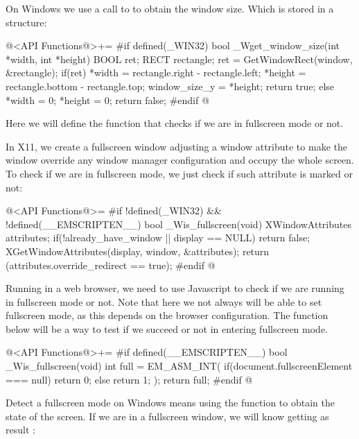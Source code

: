 
On Windows we use a call to  to obtain the
window size. Which is stored in a  structure:

\iniciocodigo
@<API Functions@>+=
#if defined(_WIN32)
bool _Wget_window_size(int *width, int *height){
  BOOL ret;
  RECT rectangle;
  ret = GetWindowRect(window, &rectangle);
  if(ret){
    *width = rectangle.right - rectangle.left;
    *height = rectangle.bottom - rectangle.top;
    window_size_y = *height;
    return true;
  }
  else{
    *width = 0;
    *height = 0;
    return false;
  }
}
#endif
@
\fimcodigo


Here we will define the function that checks if we are in fullscreen
mode or not.


In X11, we create a fullscreen window adjusting a window attribute to
make the window override any window manager configuration and occupy
the whole screen. To check if we are in fullscreen mode, we just check
if such attribute is marked or not:

\iniciocodigo
@<API Functions@>=
#if !defined(_WIN32) && !defined(__EMSCRIPTEN__)
bool _Wis_fullscreen(void){
  XWindowAttributes attributes;
  if(!already_have_window || display == NULL)
    return false;
  XGetWindowAttributes(display, window, &attributes);
  return (attributes.override_redirect == true);
}
#endif
@


Running in a web browser, we need to use Javascript to check if we are
running in fullscreen mode or not. Note that here we not always will
be able to set fullscreen mode, as this depends on the browser
configuration. The function below will be a way to test if we succeed
or not in entering fullscreen mode.

\iniciocodigo
@<API Functions@>+=
#if defined(__EMSCRIPTEN__)
bool _Wis_fullscreen(void){
  int full = EM_ASM_INT({
    if(document.fullscreenElement === null){
      return 0;
    } else{
      return 1;
    }
  });
  return full;
}
#endif
@


Detect a fullscreen mode on Windows means using the
function  to obtain the state
of the screen. If we are in a fullscreen window, we will know getting
as result :

